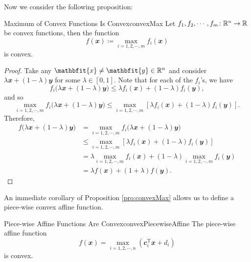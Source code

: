 \documentclass[math, code]{amznotes}
\theoremstyle{remark}
\begin{document}
Now we consider the following proposition:
\begin{probox}{Maximum of Convex Functions Is Convex}{convexMax}
    Let $f_1, f_2, \cdots, f_m \colon \mathbb{R}^n \to \mathbb{R}$ be convex functions, then the function
    \begin{equation*}
        f(\mathbfit{x}) \coloneqq \max_{i = 1, 2, \cdots, m}f_i(\mathbfit{x})
    \end{equation*}
    is convex.
    \tcblower
    \begin{proof}
        Take any $\mathbfit{x} \neq \mathbfit{y} \in \R^n$ and consider $\lambda\mathbfit{x} + (1 - \lambda)\mathbfit{y}$ for some $\lambda \in [0, 1]$. Note that for each of the $f_i$'s, we have
        \begin{equation*}
            f_i\bigl(\lambda\mathbfit{x} + (1 - \lambda)\mathbfit{y}\bigr) \leq \lambda f_i(\mathbfit{x}) + (1 - \lambda)f_i(\mathbfit{y}),
        \end{equation*}
        and so
        \begin{equation*}
            \max_{i = 1, 2, \cdots, m}f_i\bigl(\lambda\mathbfit{x} + (1 - \lambda)\mathbfit{y}\bigr) \leq \max_{i = 1, 2, \cdots, m}\left[\lambda f_i(\mathbfit{x}) + (1 - \lambda)f_i(\mathbfit{y})\right].
        \end{equation*}
        Therefore,
        \begin{align*}
            f\bigl(\lambda\mathbfit{x} + (1 - \lambda)\mathbfit{y}\bigr) & = \max_{i = 1, 2, \cdots, m}f_i\bigl(\lambda\mathbfit{x} + (1 - \lambda)\mathbfit{y}\bigr) \\
            & \leq \max_{i = 1, 2, \cdots, m}\left[\lambda f_i(\mathbfit{x}) + (1 - \lambda)f_i(\mathbfit{y})\right] \\
            & = \lambda\max_{i = 1, 2, \cdots, m}f_i(\mathbfit{x}) + (1 - \lambda)\max_{i = 1, 2, \cdots, m}f_i(\mathbfit{y}) \\
            & = \lambda f(\mathbfit{x}) + (1 + \lambda)f(\mathbfit{y}).
        \end{align*}
    \end{proof}
\end{probox}
An immediate corollary of Proposition \ref{pro:convexMax} allows us to define a piece-wise convex affine function.
\begin{corbox}{Piece-wise Affine Functions Are Convex}{convexPiecewiseAffine}
    The piece-wise affine function
    \begin{equation*}
        f(\mathbfit{x}) = \max_{i = 1, 2, \cdots, n}\left(\mathbfit{c}_i^{\mathrm{T}}\mathbfit{x} + d_i\right)
    \end{equation*}
    is convex.
\end{corbox}
\end{document}
